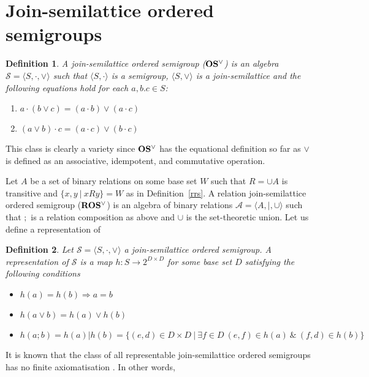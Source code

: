 \documentclass[a4paper]{article}
\theoremstyle{defin}
\newtheorem{defin}{Definition}
\theoremstyle{theorem}
\theoremstyle{prop}
\theoremstyle{lemma}
\theoremstyle{ex}
\theoremstyle{col}
\begin{document}
\section{Join-semilattice ordered semigroups}

\begin{defin} A join-semilattice ordered semigroup (${\bf OS^{\vee}}$) is an algebra $\mathcal{S} = \langle S, \cdot, \vee \rangle$ such that $\langle S, \cdot \rangle$ is a semigroup, $\langle S, \vee \rangle$ is a join-semilattice and the following equations hold for each $a, b. c \in S$:

  \begin{enumerate}
    \item $a \cdot (b \vee c) = (a \cdot b) \vee (a \cdot c)$
    \item $(a \vee b) \cdot c = (a \cdot c) \vee (b \cdot c)$
  \end{enumerate}
\end{defin}
This class is clearly a variety since ${\bf OS^{\vee}}$ has the equational definition so far as $\vee$ is defined as an associative, idempotent, and commutative operation.

Let $A$ be a set of binary relations on some base set $W$ such that $R = \cup A$ is transitive and $\{ x, y \: | \: x R y \} = W$ as in Definition~\ref{rrs}. A relation join-semilattice ordered semigroup (${\bf ROS^{\vee}}$) is an algebra of binary relations $\mathcal{A} = \langle A, |, \cup \rangle$ such that $;$ is a relation composition as above and $\cup$ is the set-theoretic union. Let us define a representation of
\begin{defin}
  Let $\mathcal{S} = \langle S, \cdot, \vee \rangle$ a join-semilattice ordered semigroup. A representation of $\mathcal{S}$ is a map
  $h : S \to 2^{D \times D}$ for some base set $D$ satisfying the following conditions
  \begin{itemize}
    \item $h(a) = h(b) \Rightarrow a = b$
    \item $h(a \vee b) = h(a) \vee h(b)$
    \item $h(a ; b) = h(a) | h(b) = \{ (e,d) \in D \times D \: | \: \exists f \in D \: (e,f) \in h(a) \: \& \: (f,d) \in h(b) \}$
  \end{itemize}
\end{defin}
It is known that the class of all representable join-semilattice ordered semigroups has no finite axiomatisation \cite{andreka1989union}. In other words,
\end{document}
